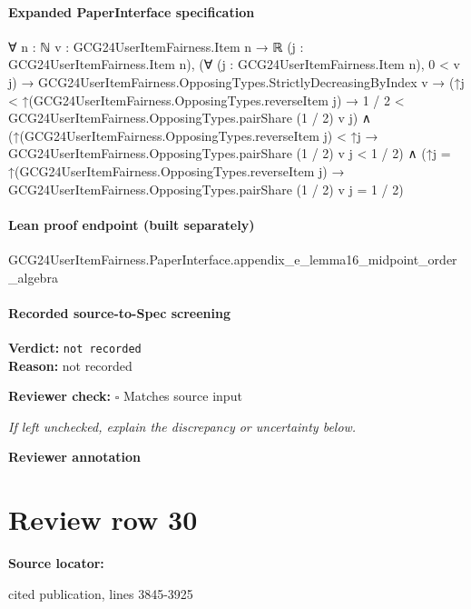 \documentclass[10pt]{article}
\newcommand{\reviewerbox}{%
  \par\noindent\fbox{\parbox{0.96\linewidth}{\rule{0pt}{0.38in}}}\par
}
\newcommand{\reviewmatch}[1]{%
  \par\noindent\textbf{Reviewer check:} $\square$\; #1\par
  \noindent\emph{If left unchecked, explain the discrepancy or uncertainty below.}\par
}
\begin{document}
\paragraph{Expanded PaperInterface specification}
\begin{ReviewVerbatim}
∀ {n : ℕ} {v : GCG24UserItemFairness.Item n → ℝ} (j : GCG24UserItemFairness.Item n),
  (∀ (j : GCG24UserItemFairness.Item n), 0 < v j) →
    GCG24UserItemFairness.OpposingTypes.StrictlyDecreasingByIndex v →
      (↑j < ↑(GCG24UserItemFairness.OpposingTypes.reverseItem j) →
          1 / 2 < GCG24UserItemFairness.OpposingTypes.pairShare (1 / 2) v j) ∧
        (↑(GCG24UserItemFairness.OpposingTypes.reverseItem j) < ↑j →
            GCG24UserItemFairness.OpposingTypes.pairShare (1 / 2) v j < 1 / 2) ∧
          (↑j = ↑(GCG24UserItemFairness.OpposingTypes.reverseItem j) →
            GCG24UserItemFairness.OpposingTypes.pairShare (1 / 2) v j = 1 / 2)
\end{ReviewVerbatim}

\paragraph{Lean proof endpoint (built separately)}\begin{ReviewVerbatim}
GCG24UserItemFairness.PaperInterface.appendix_e_lemma16_midpoint_order_algebra
\end{ReviewVerbatim}

\paragraph{Recorded source-to-Spec screening}
\textbf{Verdict:} \texttt{not recorded}
\\
\textbf{Reason:} not recorded
\reviewmatch{Matches source input}
\noindent\textbf{Reviewer annotation}\par
\reviewerbox
\clearpage
\hypertarget{source-claim-cac20912e50cfdb7}{}
\section*{Review row 30}
\textbf{Source locator:} {\footnotesize\raggedright cited publication, lines 3845-\allowbreak{}3925\par}
\end{document}
